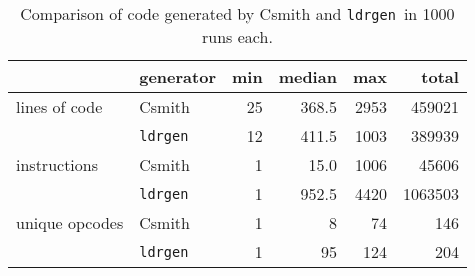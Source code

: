 \documentclass{llncs}
\newcommand\ldrgen{\texttt{ldrgen}}
\begin{document}
\begin{table}
\caption{Comparison of code generated by Csmith and \ldrgen\ in 1000 runs
each.}
\label{tab:results}

\centering
\begin{tabular}{l@{\ } | @{\ }l @{\quad} r @{\quad} r @{\quad} r @{\quad} r}

& generator & min & median & max & total \\
\hline
%
%
% 
lines of code & Csmith
    & 25 & 368.5 & 2953 & 459021 \\
& \ldrgen
    & 12 & 411.5 & 1003 & 389939
    \\[1ex]
instructions & Csmith
    & 1 &  15.0 & 1006 &   45606 \\
& \ldrgen
    & 1 & 952.5 & 4420 & 1063503
    \\[1ex]
unique opcodes & Csmith
    & 1 &  8 &  74 & 146 \\
& \ldrgen
    & 1 & 95 & 124 & 204
    \\
% 
% 
\end{tabular}
\end{table}

\end{document}
